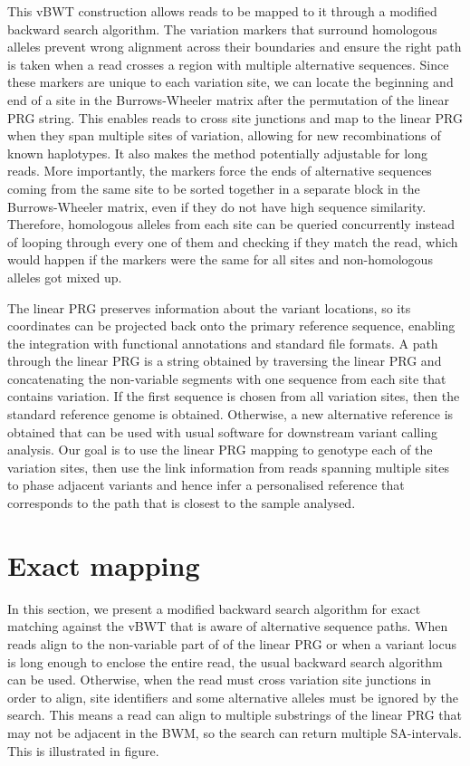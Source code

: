 \documentclass[runningheads,a4paper]{llncs}
\begin{document}
This vBWT construction allows reads to be mapped to it through a modified backward search algorithm. The variation markers that surround homologous alleles prevent wrong alignment across their boundaries and ensure the right path is taken when a read crosses a region with multiple alternative sequences. Since these markers are unique to each variation site, we can locate the beginning and end of a site in the Burrows-Wheeler matrix after the permutation of the linear PRG string. This enables reads to cross site junctions and map to the linear PRG when they span multiple sites of variation, allowing for new recombinations of known haplotypes. It also makes the method potentially adjustable for long reads. More importantly, the markers force the ends of alternative sequences coming from the same site to be sorted together in a separate block in the Burrows-Wheeler matrix, even if they do not have high sequence similarity. Therefore, homologous alleles from each site can be queried concurrently instead of looping through every one of them and checking if they match the read, which would happen if the markers were the same for all sites and non-homologous alleles got mixed up. 

The linear PRG preserves information about the variant locations, so its coordinates can be projected back onto the primary reference sequence, enabling the integration with functional annotations and standard file formats. A path through the linear PRG is a string obtained by traversing the linear PRG and concatenating the non-variable segments with one sequence from each site that contains variation. If the first sequence is chosen from all variation sites, then the standard reference genome is obtained. Otherwise, a new alternative reference is obtained that can be used with usual software for downstream variant calling analysis. Our goal is to use the linear PRG mapping to genotype each of the variation sites, then use the link information from reads spanning multiple sites to phase adjacent variants and hence infer a personalised reference that corresponds to the path that is closest to the sample analysed.

\section{Exact mapping}
In this section, we present a modified backward search algorithm for exact matching against the vBWT that is aware of alternative sequence paths. When reads align to the non-variable part of of the linear PRG or when a variant locus is long enough to enclose the entire read, the usual backward search algorithm can be used. Otherwise, when the read must cross variation site junctions in order to align, site identifiers and some alternative alleles must be ignored by the search. This means a read can align to multiple substrings of the linear PRG that may not be adjacent in the BWM, so the search can return multiple SA-intervals. This is illustrated in figure. 
\end{document}
